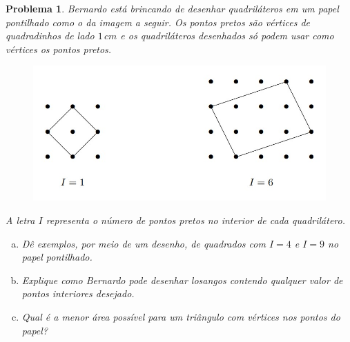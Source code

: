 \documentclass{hipatia}
\newtheorem{problem*}{Problema}
\begin{document}
\begin{problem*}
Bernardo está brincando de desenhar quadriláteros em um papel pontilhado como o da imagem a seguir. Os pontos pretos são vértices de quadradinhos de lado $1\,cm$ e os quadriláteros desenhados só podem usar como vértices os pontos pretos.


\begin{figure}[htbp]
\centering
		\includegraphics[scale=0.5]{F51.png}
\end{figure} 

\noindent A letra $I$ representa o número de pontos pretos no interior de cada quadrilátero.

\begin{enumerate}[a)]


\item Dê exemplos, por meio de um desenho, de quadrados com $I=4$ e $I=9$ no papel pontilhado.


\item Explique como Bernardo pode desenhar losangos contendo qualquer valor de pontos interiores desejado.

\item Qual é a menor área possível para um triângulo com vértices nos pontos do papel?
\end{enumerate}

\end{problem*}
\end{document}
